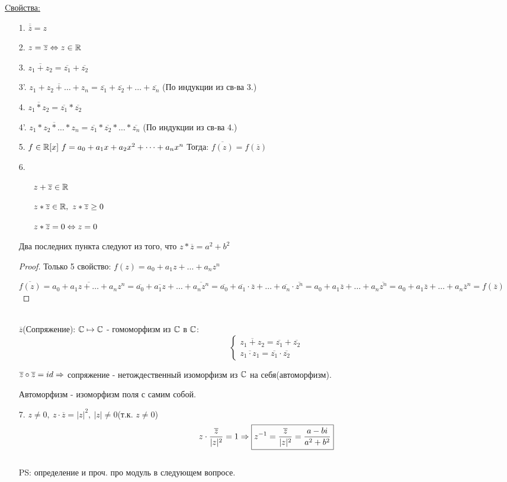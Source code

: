 \underline{Cвойства:}
\begin{itemize}
\item[1.] $\overline{\overline{z}} = z$
\item[2.] $z = \overline{z} \Leftrightarrow z \in \mathbb{R}$
\item[3.] $\overline{z_1 + z_2} = \overline{z_1} + \overline{z_2}$
\item[3'.] $\overline{z_1 + z_2 + \dots + z_n} = \overline{z_1} + \overline{z_2} + \dots + \overline{z_n}$ (По индукции из св-ва 3.)
\item[4.] $\overline{z_1*z_2} = \overline{z_1} * \overline{z_2}$
\item[4'.] $\overline{z_1 * z_2 * \dots * z_n} = \overline{z_1} * \overline{z_2} * \dots * \overline{z_n}$ (По индукции из св-ва 4.)
\item[5.] $f \in \mathbb{R}[x]~f = a_0 + a_1x + a_2x^2 + \dots + a_nx^n$ Тогда: $\overline{f(z)} = f(\overline{z})$
\item[6.] \begin{itemize}
			\item[\bullet] $z + \overline{z} \in \mathbb{R}$ 
			\item[\bullet] $z*\overline{z} \in \mathbb{R},~z*\overline{z} \ge 0$
			\item[\bullet] $z*\overline{z} = 0 \Leftrightarrow z = 0$
		 \end{itemize}	
		 Два последних пункта следуют из того, что $z*\overline{z} = a^2 + b^2$
\begin{proof}
Только 5 свойство:
$f(z)=a_0 + a_1z + \dots + a_nz^n$

$\overline{f(z)} = \overline{a_0 + a_1z + \dots + a_nz^n} = \overline{a_0} + \overline{a_1z} + \dots + \overline{a_nz^n} = \overline{a_0} + \overline{a_1} \cdot \overline{z} + \dots + \overline{a_n} \cdot \overline{z^n} = a_0 + a_1\overline{z} + \dots + a_n\overline{z^n} = a_0 + a_1\overline{z} + \dots + a_n{\overline{z}}^n = f(\overline{z})$
\end{proof}   
\\

$\overline{z}$(Сопряжение): $\mathbb{C} \mapsto \mathbb{C}$ - гомоморфизм из $\mathbb{C}$ в $\mathbb{C}$:\\
$$
	\begin{cases}
	\overline{z_1 + z_2} = \overline{z_1} + \overline{z_2} \\
	\overline{z_1 \cdot z_1} = \overline{z_1} \cdot \overline{z_2}
	\end{cases}
$$

$\overline{z} \circ \overline{z} = id \Rightarrow $ сопряжение - нетождественный изоморфизм из $\mathbb{C}$ на себя(автоморфизм).
\begin{Def}
	Автоморфизм - изоморфизм поля с самим собой.
\end{Def}
\item[7.] $z \ne 0,~z \cdot \overline{z} = |z|^2,~|z| \ne 0$(т.к. $z \ne 0$) \\
$$ z \cdot \frac{\overline{z}}{|z|^2} = 1 \Rightarrow \boxed{z^{-1} = \frac{\overline{z}}{|z|^2} = \frac{a - bi}{a^2 + b^2}} $$ \\
PS: определение и проч. про модуль в следующем вопросе.
\end{itemize}

